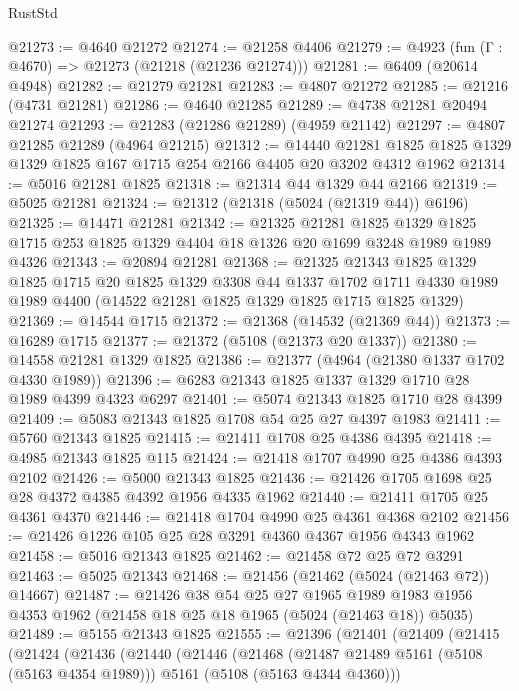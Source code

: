 \begin{lexlean}{RustStd}
\begin{coremodule}
@21273 := @4640 @21272
@21274 := @21258 @4406
@21279 := @4923 (fun (Γ : @4670) => @21273 (@21218 (@21236 @21274)))
@21281 := @6409 (@20614 @4948)
@21282 := @21279 @21281
@21283 := @4807 @21272
@21285 := @21216 (@4731 @21281)
@21286 := @4640 @21285
@21289 := @4738 @21281 @20494 @21274
@21293 := @21283 (@21286 @21289) (@4959 @21142)
@21297 := @4807 @21285 @21289 (@4964 @21215)
@21312 := @14440
    @21281
    @1825
    @1825
    @1329
    @1329
    @1825
    @167
    @1715
    @254
    @2166
    @4405
    @20
    @3202
    @4312
    @1962
@21314 := @5016 @21281 @1825
@21318 := @21314 @44 @1329 @44 @2166
@21319 := @5025 @21281
@21324 := @21312 (@21318 (@5024 (@21319 @44)) @6196)
@21325 := @14471 @21281
@21342 := @21325
    @21281
    @1825
    @1329
    @1825
    @1715
    @253
    @1825
    @1329
    @4404
    @18
    @1326
    @20
    @1699
    @3248
    @1989
    @1989
    @4326
@21343 := @20894 @21281
@21368 := @21325
    @21343
    @1825
    @1329
    @1825
    @1715
    @20
    @1825
    @1329
    @3308
    @44
    @1337
    @1702
    @1711
    @4330
    @1989
    @1989
    @4400
    (@14522 @21281 @1825 @1329 @1825 @1715 @1825 @1329)
@21369 := @14544 @1715
@21372 := @21368 (@14532 (@21369 @44))
@21373 := @16289 @1715
@21377 := @21372 (@5108 (@21373 @20 @1337))
@21380 := @14558 @21281 @1329 @1825
@21386 := @21377 (@4964 (@21380 @1337 @1702 @4330 @1989))
@21396 := @6283 @21343 @1825 @1337 @1329 @1710 @28 @1989 @4399 @4323 @6297
@21401 := @5074 @21343 @1825 @1710 @28 @4399
@21409 := @5083 @21343 @1825 @1708 @54 @25 @27 @4397 @1983
@21411 := @5760 @21343 @1825
@21415 := @21411 @1708 @25 @4386 @4395
@21418 := @4985 @21343 @1825 @115
@21424 := @21418 @1707 @4990 @25 @4386 @4393 @2102
@21426 := @5000 @21343 @1825
@21436 := @21426 @1705 @1698 @25 @28 @4372 @4385 @4392 @1956 @4335 @1962
@21440 := @21411 @1705 @25 @4361 @4370
@21446 := @21418 @1704 @4990 @25 @4361 @4368 @2102
@21456 := @21426 @1226 @105 @25 @28 @3291 @4360 @4367 @1956 @4343 @1962
@21458 := @5016 @21343 @1825
@21462 := @21458 @72 @25 @72 @3291
@21463 := @5025 @21343
@21468 := @21456 (@21462 (@5024 (@21463 @72)) @14667)
@21487 := @21426
    @38
    @54
    @25
    @27
    @1965
    @1989
    @1983
    @1956
    @4353
    @1962
    (@21458 @18 @25 @18 @1965 (@5024 (@21463 @18)) @5035)
@21489 := @5155 @21343 @1825
@21555 := @21396
    (@21401
      (@21409
        (@21415
          (@21424
            (@21436
              (@21440
                (@21446
                  (@21468
                    (@21487 @21489 @5161 (@5108 (@5163 @4354 @1989)))
                    @5161
                    (@5108 (@5163 @4344 @4360)))

\end{coremodule}
\end{lexlean}

